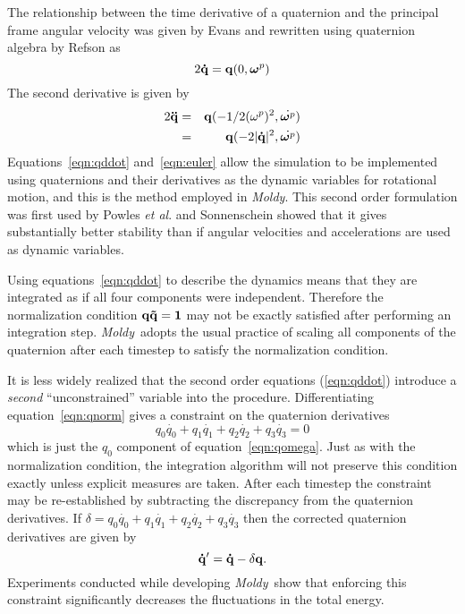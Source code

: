 \documentclass[twoside]{report}
\newcommand{\moldy}{{\em Moldy}}
\newcommand{\bm}[1]{\mbox{\boldmath \protect\(#1\protect\)}}
\begin{document}
The relationship between the time derivative of a quaternion and the
principal frame angular velocity was given by Evans\cite[Equation
27]{evans:77} and rewritten using quaternion algebra by 
Refson\cite{refson:87a} as
\begin{equation}
2 {\bf \dot{q}} = {\bf q}(0,\bm{\omega}^p)
\label{eqn:qomega}
\end{equation}
The second derivative is given by
\begin{eqnarray}
\nonumber
2{\bf \ddot{q}} & = & {\bf q}(- 1/2 (\omega^p)^2,\dot{\bm{\omega}^p}) \\
 & = & {\bf q}(-2 |{\bf \dot{q}}|^2,\dot{\bm{\omega}^p})
\label{eqn:qddot}
\end{eqnarray}
Equations~\ref{eqn:qddot} and~\ref{eqn:euler} allow the simulation to
be implemented using quaternions and their derivatives as the dynamic
variables for rotational motion, and this is the method employed in
\moldy.  This second order formulation was first used by Powles {\em et
al}.\cite{powles:79} and Sonnenschein showed\cite{sonnenschein:85}
that it gives substantially better stability than if angular
velocities and accelerations are used as dynamic variables.
 
Using equations~\ref{eqn:qddot} to describe the dynamics means that
they are integrated as if all four components were independent.
Therefore the normalization condition $\bf q \tilde{q} = 1$ may not be
exactly satisfied after performing an integration step.  \moldy\
adopts the usual practice of scaling all components of the quaternion
after each timestep to satisfy the normalization condition\cite{evans:77b}.

It is less widely realized that the second order equations
(\ref{eqn:qddot}) introduce a {\em second} ``unconstrained'' variable
into the procedure.  Differentiating equation~\ref{eqn:qnorm} gives a
constraint on the quaternion derivatives
\begin{equation}
q_0\dot{q_0} + q_1\dot{q_1} + q_2\dot{q_2} + q_3\dot{q_3} = 0
\label{eqn:qconst} 
\end{equation}
which is just the $q_0$ component of equation~\ref{eqn:qomega}.
Just as with the normalization condition, the integration algorithm
will not preserve this condition exactly unless explicit measures are
taken.  After each timestep the constraint may be re-established by
subtracting the discrepancy from the quaternion derivatives.  If
$\delta = q_0\dot{q_0} + q_1\dot{q_1} + q_2\dot{q_2} + q_3\dot{q_3}$
then the corrected quaternion derivatives are given by
\begin{equation}
{\bf \dot{q}^\prime } =  {\bf \dot{q}} - \delta {\bf q}.
\label{eqn:qconcorr}
\end{equation}
Experiments conducted while developing \moldy\ show that enforcing
this constraint significantly decreases the fluctuations in the total
energy. 
\end{document}
